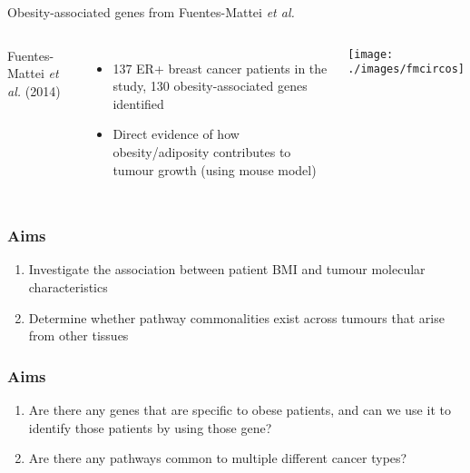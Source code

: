 \documentclass[handout]{beamer}
\begin{document}
\begin{frame}{Obesity-associated genes from Fuentes-Mattei \textit{et al.}}
	\begin{columns}
		Fuentes-Mattei \textit{et al.} (2014)
		\begin{itemize}
			\item 137 ER+ breast cancer patients in the study, 130 obesity-associated genes identified
			\item Direct evidence of how obesity/adiposity contributes to tumour growth (using mouse model)
		\end{itemize}
		\texttt{[image: ./images/fmcircos]}
	\end{columns}
\end{frame}

\begin{frame}
	\frametitle{Aims}
	\begin{enumerate}
		\item Investigate the association between patient BMI and tumour molecular characteristics
		\item Determine whether pathway commonalities exist across tumours that arise from other tissues
	\end{enumerate}
\end{frame}

\begin{frame}
	\frametitle{Aims}
	\begin{enumerate}
		\item Are there any genes that are specific to obese patients, and can we use it to identify those patients by using those gene?
		\item Are there any pathways common to multiple different cancer types?
	\end{enumerate}
\end{frame}


\end{document}
